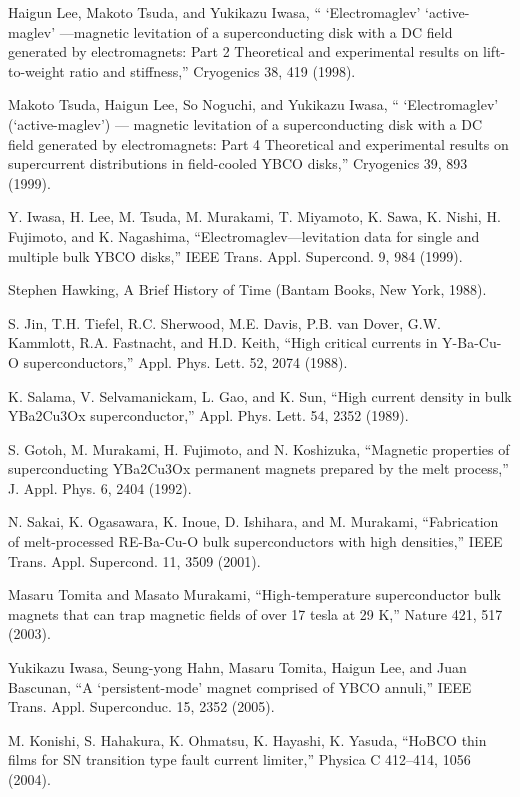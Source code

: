 \noindent [9.6] Haigun Lee, Makoto Tsuda, and Yukikazu Iwasa, `` ‘Electromaglev’ ‘active-maglev’ —magnetic levitation of a superconducting disk with a DC field generated by electromagnets: Part 2 Theoretical and experimental results on lift-to-weight ratio and stiffness,” Cryogenics 38, 419 (1998).

\noindent [9.7] Makoto Tsuda, Haigun Lee, So Noguchi, and Yukikazu Iwasa, `` ‘Electromaglev’
(‘active-maglev’) — magnetic levitation of a superconducting disk with a DC field
generated by electromagnets: Part 4 Theoretical and experimental results on supercurrent
distributions in field-cooled YBCO disks,” Cryogenics 39, 893 (1999).

\noindent [9.8] Y. Iwasa, H. Lee, M. Tsuda, M. Murakami, T. Miyamoto, K. Sawa, K. Nishi,
H. Fujimoto, and K. Nagashima, ``Electromaglev—levitation data for single and
multiple bulk YBCO disks,” IEEE Trans. Appl. Supercond. 9, 984 (1999).

\noindent [9.9] Stephen Hawking, A Brief History of Time (Bantam Books, New York, 1988).

\noindent [9.10] S. Jin, T.H. Tiefel, R.C. Sherwood, M.E. Davis, P.B. van Dover, G.W. Kammlott,
R.A. Fastnacht, and H.D. Keith, ``High critical currents in Y-Ba-Cu-O superconductors,”
Appl. Phys. Lett. 52, 2074 (1988).

\noindent [9.11] K. Salama, V. Selvamanickam, L. Gao, and K. Sun, ``High current density in bulk
YBa2Cu3Ox superconductor,” Appl. Phys. Lett. 54, 2352 (1989).

\noindent [9.12] S. Gotoh, M. Murakami, H. Fujimoto, and N. Koshizuka, ``Magnetic properties of superconducting YBa2Cu3Ox permanent magnets prepared by the melt process,” J. Appl. Phys. 6, 2404 (1992).

\noindent [9.13] N. Sakai, K. Ogasawara, K. Inoue, D. Ishihara, and M. Murakami, ``Fabrication of melt-processed RE-Ba-Cu-O bulk superconductors with high densities,” IEEE Trans. Appl. Supercond. 11, 3509 (2001).

\noindent [9.14] Masaru Tomita and Masato Murakami, ``High-temperature superconductor bulk magnets that can trap magnetic fields of over 17 tesla at 29 K,” Nature 421, 517 (2003).

\noindent [9.15] Yukikazu Iwasa, Seung-yong Hahn, Masaru Tomita, Haigun Lee, and Juan Bascunan, ``A ‘persistent-mode’ magnet comprised of YBCO annuli,” IEEE Trans.
Appl. Superconduc. 15, 2352 (2005).

\noindent [9.16] M. Konishi, S. Hahakura, K. Ohmatsu, K. Hayashi, K. Yasuda, ``HoBCO thin films for SN transition type fault current limiter,” Physica C 412–414, 1056 (2004).

